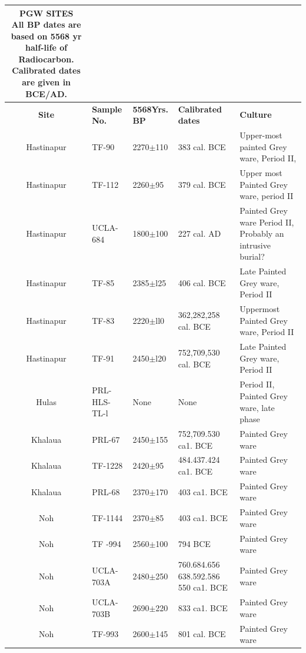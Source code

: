 {{\setlength\tabcolsep{2pt}
{\fontsize{7}{9}\selectfont
\begin{longtable}{|c|p{1.4cm}|p{1cm}|p{1.5cm}|p{3cm}|}
\captionsetup{font=footnotesize}
\caption{PGW SITES\\[10pt] 
All BP dates are based on 5568 yr half-life of Radiocarbon.\\ 
Calibrated dates are given in BCE/AD.}\label{table III.5}\\
\hline
\multicolumn{1}{|m{1cm}|}{\centering \textbf{Site}} &\multicolumn{1}{m{1.4cm}|}{\centering \textbf{Sample No.}}&\multicolumn{1}{m{1cm}|}{\centering \textbf{5568Yrs. BP}}& \multicolumn{1}{m{1.5cm}|}{\centering \textbf{Calibrated dates}}& \multicolumn{1}{m{3cm}|}{\centering \textbf{Culture}}\\
\endfirsthead
\hline
\endhead
\hline
\endfoot
\hline
Hastinapur & TF-90 & 2270$\pm$110 & 383 cal. BCE & Upper-most painted Grey ware, Period II, \\
Hastinapur & TF-112 & 2260$\pm$95 & 379 cal. BCE & Upper most Painted Grey ware, period II\\
Hastinapur & UCLA-684 &1800$\pm$100 & 227 cal. AD & Painted Grey ware Period II, Probably an intrusive burial?\\
Hastinapur & TF-85 & 2385$\pm$l25 & 406 cal. BCE & Late Painted Grey ware, Period II\\
Hastinapur & TF-83 & 2220$\pm$ll0 & 362,282,258 cal. BCE & Uppermost Painted Grey ware, Period II\\
Hastinapur & TF-91 & 2450$\pm$l20 & 752,709,530 cal. BCE & Late Painted Grey ware, Period II\\
Hulas & PRL-HLS-TL-l & None & None &  Period II, Painted Grey ware, late phase\\
Khalaua & PRL-67 & 2450$\pm$155 & 752,709.530 ca1. BCE & Painted Grey ware\\
Khalaua & TF-1228 & 2420$\pm$95 & 484.437.424 ca1. BCE & Painted Grey ware\\
Khalaua & PRL-68 & 2370$\pm$170 & 403 ca1. BCE & Painted Grey ware\\
Noh & TF-1144 & 2370$\pm$85 & 403 ca1. BCE & Painted Grey ware\\
Noh & TF -994 & 2560$\pm$100 & 794 BCE & Painted Grey ware\\
Noh & UCLA- 703A & 2480$\pm$250 & 760.684.656 638.592.586 550 ca1. BCE & Painted Grey ware\\
Noh & UCLA-703B & 2690$\pm$220 & 833 ca1. BCE &Painted Grey ware\\
Noh & TF-993 & 2600$\pm$145 & 801 cal. BCE &Painted Grey ware\\

\end{longtable}}}}
